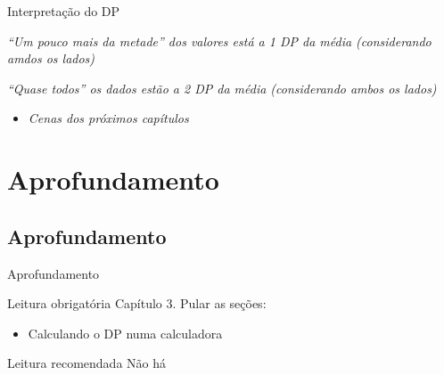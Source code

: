 \documentclass{beamer}
\begin{document}
\begin{frame}{\scriptsize Interpretação do DP}
  \begin{block}{}
    \footnotesize
    {\em ``Um pouco mais da metade'' dos valores está a 1 DP da média (considerando amdos os lados)}
  \end{block}
  \begin{block}{}
    \footnotesize
    {\em ``Quase todos'' os dados estão a 2 DP da média (considerando ambos os lados)}
  \end{block}
  \begin{itemize}
    \footnotesize
  \item {\em Cenas dos próximos capítulos}
  \end{itemize}
\end{frame}


\section{Aprofundamento}

\subsection{Aprofundamento}

\begin{frame}{\scriptsize Aprofundamento}
  \begin{block}{Leitura obrigatória}
    \footnotesize
    Capítulo 3. Pular as seções:
    \begin{itemize}
      \footnotesize
    \item Calculando o DP numa calculadora
    \end{itemize}
  \end{block}
  \begin{block}{Leitura recomendada}
    \scriptsize
    Não há
  \end{block}
\end{frame}
\end{document}
